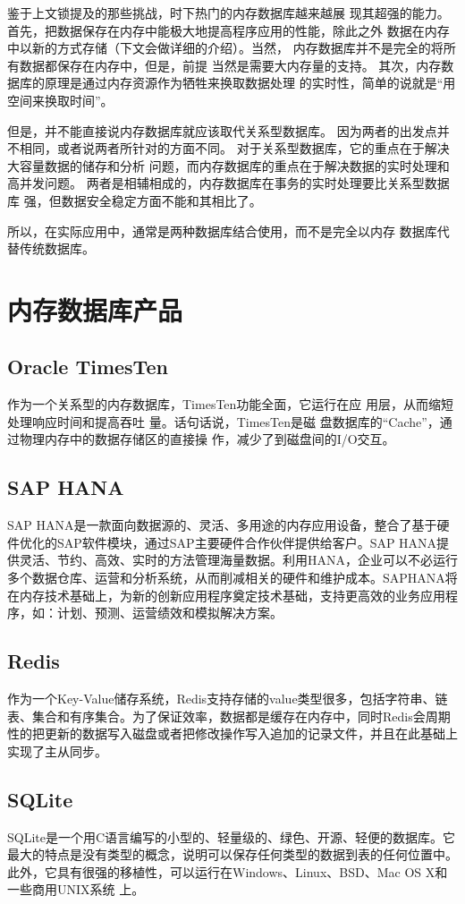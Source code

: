 \documentclass{zjutthesis}
\begin{document}
鉴于上文锁提及的那些挑战，时下热门的内存数据库越来越展
现其超强的能力。首先，把数据保存在内存中能极大地提高程序应用的性能，除此之外
数据在内存中以新的方式存储（下文会做详细的介绍）。当然，
内存数据库并不是完全的将所有数据都保存在内存中，但是，前提
当然是需要大内存量的支持。
其次，内存数据库的原理是通过内存资源作为牺牲来换取数据处理
的实时性，简单的说就是“用空间来换取时间”。

但是，并不能直接说内存数据库就应该取代关系型数据库。
因为两者的出发点并不相同，或者说两者所针对的方面不同。
对于关系型数据库，它的重点在于解决大容量数据的储存和分析
问题，而内存数据库的重点在于解决数据的实时处理和高并发问题。
两者是相辅相成的，内存数据库在事务的实时处理要比关系型数据库
强，但数据安全稳定方面不能和其相比了。

所以，在实际应用中，通常是两种数据库结合使用，而不是完全以内存
数据库代替传统数据库。

\section{内存数据库产品}
\subsection{Oracle TimesTen}
作为一个关系型的内存数据库，TimesTen功能全面，它运行在应
用层，从而缩短处理响应时间和提高吞吐
量。话句话说，TimesTen是磁
盘数据库的“Cache”，通过物理内存中的数据存储区的直接操
作，减少了到磁盘间的I/O交互。

\subsection{SAP HANA}
SAP HANA是一款面向数据源的、灵活、多用途的内存应用设备，整合了基于硬件优化的SAP软件模块，通过SAP主要硬件合作伙伴提供给客户。SAP HANA提供灵活、节约、高效、实时的方法管理海量数据。利用HANA，企业可以不必运行多个数据仓库、运营和分析系统，从而削减相关的硬件和维护成本。SAPHANA将在内存技术基础上，为新的创新应用程序奠定技术基础，支持更高效的业务应用程序，如：计划、预测、运营绩效和模拟解决方案。

\subsection{Redis}
作为一个Key-Value储存系统，Redis支持存储的value类型很多，包括字符串、链表、集合和有序集合。为了保证效率，数据都是缓存在内存中，同时Redis会周期性的把更新的数据写入磁盘或者把修改操作写入追加的记录文件，并且在此基础上实现了主从同步。

\subsection{SQLite}
SQLite是一个用C语言编写的小型的、轻量级的、绿色、开源、轻便的数据库。它最大的特点是没有类型的概念，说明可以保存任何类型的数据到表的任何位置中。此外，它具有很强的移植性，可以运行在Windows、Linux、BSD、Mac OS X和一些商用UNIX系统
上。
\end{document}
